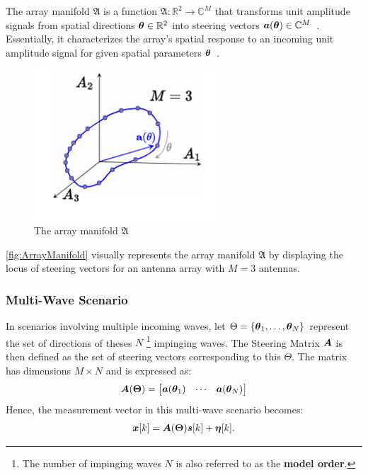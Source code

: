 The array manifold \( \mathfrak{A} \) is a function \( \mathfrak{A} : \mathbb{R}^2 \to \mathbb{C}^{M} \) that transforms
unit amplitude signals from spatial directions \( \boldsymbol{\theta} \in \mathbb{R}^2 \) into steering vectors
\( \boldsymbol{a}(\boldsymbol{\theta}) \in \mathbb{C}^{M} \)~\cite{oap.ch4, tuncer.ch1}. Essentially, it characterizes the array's spatial
response to an incoming unit amplitude signal for given spatial parameters \( \boldsymbol{\theta} \)~\cite{yu22RCNN}.

\begin{figure}[H]
    \centering
    \includegraphics[width=0.6\textwidth]{figures/02_SignalModel/array_manifold.pdf}
    \caption{The array manifold \( \mathfrak{A} \)~\cite[ch4.5.2]{demmel}}
    \label{fig:ArrayManifold}
\end{figure}

\autoref{fig:ArrayManifold} visually represents the array manifold \( \mathfrak{A} \) by displaying the locus of
steering vectors for an antenna array with \( M = 3 \) antennas.
\\

\subsubsection*{Multi-Wave Scenario}
In scenarios involving multiple incoming waves, let \( \Theta = \{\boldsymbol{\theta}_1, \ldots, \boldsymbol{\theta}_N\} \) represent the set of
directions of theses \( N \)%
\footnote{The number of impinging waves \( N \) is also referred to as the \textbf{model order}.}
impinging waves. The Steering Matrix \( \boldsymbol{A} \) is then defined as the set of steering vectors
corresponding to this \( \Theta \). The matrix has dimensions \( M \times N \) and is expressed as:
\begin{align}
    \boldsymbol{A}(\boldsymbol{\Theta}) =
    \begin{bmatrix} \boldsymbol{a}(\boldsymbol{\theta}_1) & \cdots & \boldsymbol{a}(\boldsymbol{\theta}_N) \end{bmatrix}
    \label{eq:SteeringMatrix}
\end{align}
Hence, the measurement vector in this multi-wave scenario becomes:
\begin{align}
    \boldsymbol{x}[k] = \boldsymbol{A}(\boldsymbol{\Theta}) \boldsymbol{s}[k] + \boldsymbol{\eta}[k].
    \label{eq:MeasVecMult}
\end{align}

